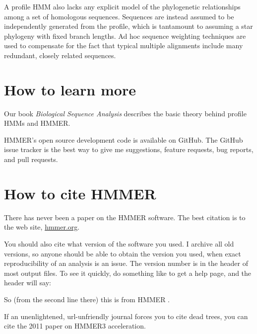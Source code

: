 A profile HMM also lacks any explicit model of the phylogenetic
relationships among a set of homologous sequences. Sequences are
instead assumed to be independently generated from the profile, which
is tantamount to assuming a star phylogeny with fixed branch
lengths. Ad hoc sequence weighting techniques are used to compensate
for the fact that typical multiple alignments include many redundant,
closely related sequences.






\section{How to learn more}

Our book \emph{Biological Sequence Analysis}\cite{Durbin98} describes the basic
theory behind profile HMMs and HMMER.

HMMER's open source development code is available on
GitHub.
The GitHub issue tracker is the best way to give me suggestions,
feature requests, bug reports, and pull requests.




\section{How to cite HMMER}

There has never been a paper on the HMMER software.  The best citation is to
the web site, \href{http://hmmer.org}{hmmer.org}.

You should also cite what version of the software you used. I archive
all old versions, so anyone should be able to obtain the version you
used, when exact reproducibility of an analysis is an issue.  The
version number is in the header of most output files. To see it
quickly, do something like  to get a help page, and
the header will say:


So (from the second line there) this is from HMMER \HMMERversion{}.

If an unenlightened, url-unfriendly journal forces you to cite dead
trees, you can cite the 2011 paper on HMMER3
acceleration.\cite{Eddy11}



